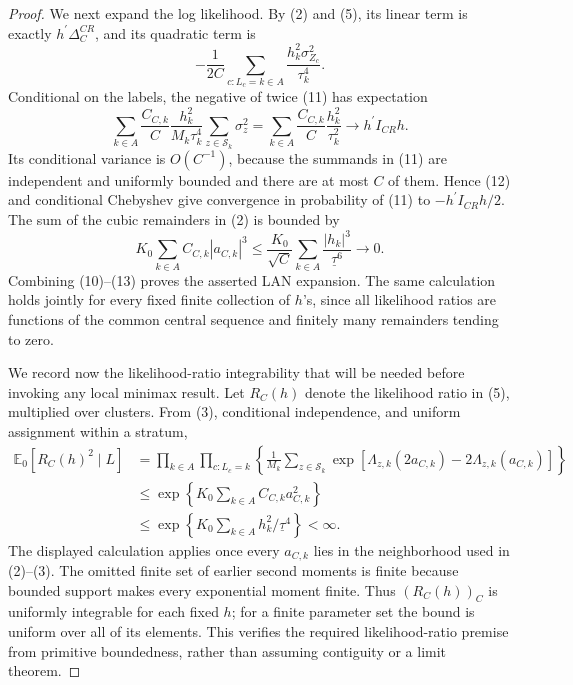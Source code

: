 \documentclass{article}
\begin{document}
\begin{proof}
We next expand the log likelihood.  By (2) and (5), its linear term is exactly \(h^{\prime}\Delta_C^{CR}\), and its quadratic term is
\[
 -\frac1{2C}\sum_{c:L_c=k\in A}
       \frac{h_k^2\sigma_{Z_c}^2}{\tau_k^4}.                    \tag{11}
\]
Conditional on the labels, the negative of twice (11) has expectation
\[
 \sum_{k\in A}\frac{C_{C,k}}C
       \frac{h_k^2}{M_k\tau_k^4}
       \sum_{z\in\mathcal S_k}\sigma_z^2
 =\sum_{k\in A}\frac{C_{C,k}}C\frac{h_k^2}{\tau_k^2}
 \longrightarrow h^{\prime}I_{CR}h.                            \tag{12}
\]
Its conditional variance is \(O(C^{-1})\), because the summands in (11) are independent and uniformly bounded and there are at most \(C\) of them.  Hence (12) and conditional Chebyshev give convergence in probability of (11) to \(-h^{\prime}I_{CR}h/2\).  The sum of the cubic remainders in (2) is bounded by
\[
 K_0\sum_{k\in A}C_{C,k}|a_{C,k}|^3
 \leq \frac{K_0}{\sqrt C}
       \sum_{k\in A}\frac{|h_k|^3}{\underline\tau^6}
 \longrightarrow0.                                              \tag{13}
\]
Combining (10)--(13) proves the asserted LAN expansion.  The same calculation holds jointly for every fixed finite collection of \(h\)'s, since all likelihood ratios are functions of the common central sequence and finitely many remainders tending to zero.

We record now the likelihood-ratio integrability that will be needed before invoking any local minimax result.  Let \(R_C(h)\) denote the likelihood ratio in (5), multiplied over clusters.  From (3), conditional independence, and uniform assignment within a stratum,
\[
 \begin{aligned}
 \mathbb E_0[R_C(h)^2\mid L]
 &=\prod_{k\in A}\prod_{c:L_c=k}
   \left\{\frac1{M_k}\sum_{z\in\mathcal S_k}
   \exp[\Lambda_{z,k}(2a_{C,k})-2\Lambda_{z,k}(a_{C,k})]\right\}\\
 &\leq
 \exp\!\left\{K_0\sum_{k\in A}C_{C,k}a_{C,k}^2\right\}\\
 &\leq
 \exp\!\left\{K_0\sum_{k\in A}h_k^2/\underline\tau^4\right\}<\infty .
 \end{aligned}                                                   \tag{14}
\]
The displayed calculation applies once every \(a_{C,k}\) lies in the neighborhood used in (2)--(3).  The omitted finite set of earlier second moments is finite because bounded support makes every exponential moment finite.  Thus \((R_C(h))_C\) is uniformly integrable for each fixed \(h\); for a finite parameter set the bound is uniform over all of its elements.  This verifies the required likelihood-ratio premise from primitive boundedness, rather than assuming contiguity or a limit theorem.


\end{proof}
\end{document}
